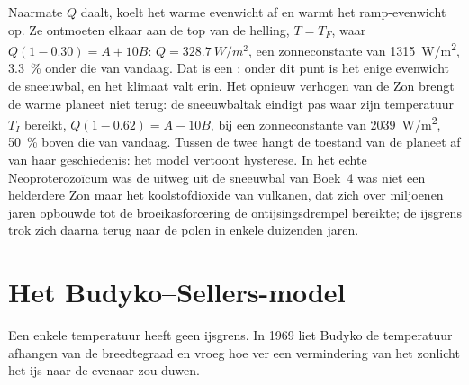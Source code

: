 \begin{omfigure}
\par{}\label{fig:b3:climate-models:zero-d}
\end{omfigure}

Naarmate $Q$ daalt, koelt het warme evenwicht af en warmt het ramp-evenwicht op.
Ze ontmoeten elkaar aan de top van de helling, $T = T_F$, waar $Q(1 - 0.30) = A +
10B$: $Q = \qty{328.7}{W/m^2}$, een zonneconstante van \qty{1315}{W/m^2},
\qty{3.3}{\percent} onder die van vandaag. Dat is een : onder
dit punt is het enige evenwicht de sneeuwbal, en het klimaat valt erin.
Het opnieuw verhogen van de Zon brengt de warme planeet niet terug: de sneeuwbaltak
eindigt pas waar zijn temperatuur $T_I$ bereikt, $Q(1 - 0.62) = A -
10B$, bij een zonneconstante van \qty{2039}{W/m^2}, \qty{50}{\percent} boven
die van vandaag. Tussen de twee hangt de toestand van de planeet af van haar geschiedenis:
het model vertoont hysterese. In het echte Neoproterozoïcum was de uitweg uit de
sneeuwbal van Boek~4 was niet een helderdere Zon maar het koolstofdioxide
van vulkanen, dat zich over miljoenen jaren opbouwde tot de broeikasforcering
de ontijsingsdrempel bereikte; de ijsgrens trok zich daarna terug naar
de polen in enkele duizenden jaren.

\section{Het Budyko--Sellers-model}\label{sec:b3:climate-models:budyko-sellers}

Een enkele temperatuur heeft geen ijsgrens. In 1969 liet Budyko de temperatuur
afhangen van de breedtegraad en vroeg hoe ver een vermindering van het zonlicht het ijs
naar de evenaar zou duwen.

